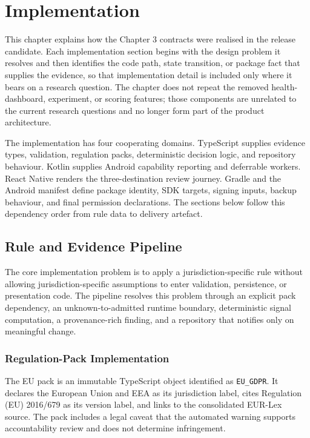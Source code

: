 \chapter{Implementation}

This chapter explains how the Chapter 3 contracts were realised in the release candidate. Each implementation section begins with the design problem it resolves and then identifies the code path, state transition, or package fact that supplies the evidence, so that implementation detail is included only where it bears on a research question. The chapter does not repeat the removed health-dashboard, experiment, or scoring features; those components are unrelated to the current research questions and no longer form part of the product architecture.

The implementation has four cooperating domains. TypeScript supplies evidence types, validation, regulation packs, deterministic decision logic, and repository behaviour. Kotlin supplies Android capability reporting and deferrable workers. React Native renders the three-destination review journey. Gradle and the Android manifest define package identity, SDK targets, signing inputs, backup behaviour, and final permission declarations. The sections below follow this dependency order from rule data to delivery artefact.


\section{Rule and Evidence Pipeline}

The core implementation problem is to apply a jurisdiction-specific rule without allowing jurisdiction-specific assumptions to enter validation, persistence, or presentation code. The pipeline resolves this problem through an explicit pack dependency, an unknown-to-admitted runtime boundary, deterministic signal computation, a provenance-rich finding, and a repository that notifies only on meaningful change.

\subsection{Regulation-Pack Implementation}

The EU pack is an immutable TypeScript object identified as \texttt{EU\_GDPR}. It declares the European Union and EEA as its jurisdiction label, cites Regulation (EU) 2016/679 as its version label, and links to the consolidated EUR-Lex source. The pack includes a legal caveat that the automated warning supports accountability review and does not determine infringement.

